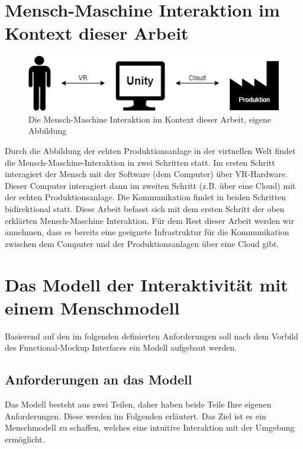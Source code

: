 \section{Mensch-Maschine Interaktion im Kontext dieser Arbeit}\label{sec:MMInteraktion}
\begin{figure}[h]
	\centering
	\includegraphics[width=0.7\linewidth]{Bilder/A19_MMI}
	\caption{Die Mensch-Maschine Interaktion im Kontext dieser Arbeit, eigene Abbildung}
	\label{fig:MMI}
\end{figure}
\noindent Durch die Abbildung der echten Produktionsanlage in der virtuellen Welt findet die Mensch-Maschine-Interaktion in zwei Schritten statt. Im ersten Schritt interagiert der Mensch mit der Software (dem Computer) über VR-Hardware. Dieser Computer interagiert dann im zweiten Schritt (z.B. über eine Cloud) mit der echten Produktionsanlage. Die Kommunikation findet in beiden Schritten bidirektional statt.
\newline
Diese Arbeit befasst sich mit dem ersten Schritt der oben erklärten Mensch-Maschine Interaktion. Für dem Rest dieser Arbeit werden wir annehmen, dass es bereits eine geeignete Infrastruktur für die Kommunikation zwischen dem Computer und der Produktionsanlagen über eine Cloud gibt.

\section{Das Modell der Interaktivität mit einem Menschmodell}\label{sec:ModellAufbau}
Basierend auf den im folgenden definierten Anforderungen soll nach dem Vorbild des Functional-Mockup Interfaces ein Modell aufgebaut werden.

\subsection{Anforderungen an das Modell}\label{sec:AnforderungenKonzept}
Das Modell besteht aus zwei Teilen, daher haben beide Teile Ihre eigenen Anforderungen. Diese werden im Folgenden erläutert. Das Ziel ist es ein Menschmodell zu schaffen, welches eine intuitive Interaktion mit der Umgebung ermöglicht.

